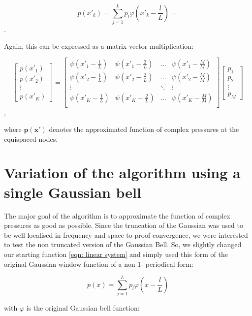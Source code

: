 \documentclass[11pt]{report} %
\begin{document}
\begin{equation}
 p(x'_{k})=\sum\limits_{j=1}^L p_{l}\varphi(x'_{k}-\frac{l}{L})=
\end{equation}. 

Again, this can be expressed as a matrix vector multiplication: 

\[
\begin{bmatrix}
	p(x'_1) \\
	p(x'_2) \\
	\vdots\\
	p(x'_K)
\end{bmatrix} = 
\begin{bmatrix}
    \psi(x'_{1}-\frac{1}{L})& \psi(x'_{1}-\frac{2}{L})& \dots & \psi(x'_{1}-\frac{M}{M}) \\
    \psi(x'_{2}-\frac{1}{L})& \psi(x'_{2}-\frac{2}{L})& \dots & \psi(x'_{2}-\frac{M}{M}) \\
    \vdots &  &\ddots & \vdots \\
    \psi(x'_{K}-\frac{1}{L})& \psi(x'_{K}-\frac{2}{L})& \dots & \psi(x'_{K}-\frac{M}{M}) \\   
\end{bmatrix}
\begin{bmatrix}
    p_1 \\
    p_2 \\
    \vdots \\
    p_{M}
\end{bmatrix}
\],

where $\bm{p(x')}$ denotes the approximated function of complex pressures at the equispaced nodes. 

\section{Variation of the algorithm using a single Gaussian bell}
The major goal of the algorithm is to approximate the function of complex pressures as good as possible.
Since the truncation of the Gaussian was used to be well localised in frequency and space to proof convergence, we were interested to test the non truncated version of the Gaussian Bell.
So, we slightly changed our starting function \eqref{eqn: linear system} and simply used this form of the original Gaussian window function of a non 1- periodical form:
  
\begin{equation}
 p(x)=\sum\limits_{j=1}^L p_{l}\varphi(x-\frac{l}{L})
\end{equation}

with $\varphi$ is the original Gaussian bell function: 
\end{document}
